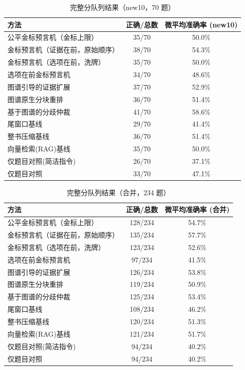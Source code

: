 \documentclass[UTF8,11pt]{ctexart}
\begin{document}
\begin{table}[t]
\centering
\caption{完整分队列结果（new10，70 题）}
\label{tab:full-new10}
\small
\begin{tabular}{lcc}
\toprule
方法 & 正确/总数 & 微平均准确率 (new10) \\
\midrule
公平金标预言机（金标上限） & 35/70 & 50.0\% \\
金标预言机（证据在前，原始顺序） & 38/70 & 54.3\% \\
金标预言机（选项在前，洗牌） & 35/70 & 50.0\% \\
选项在前金标预言机 & 34/70 & 48.6\% \\
图谱引导的证据扩展 & 37/70 & 52.9\% \\
图谱原生分块重排 & 36/70 & 51.4\% \\
基于图谱的分歧仲裁 & 41/70 & 58.6\% \\
尾窗口基线 & 29/70 & 41.4\% \\
整书压缩基线 & 36/70 & 51.4\% \\
向量检索(RAG)基线 & 35/70 & 50.0\% \\
仅题目对照(简洁指令) & 26/70 & 37.1\% \\
仅题目对照 & 33/70 & 47.1\% \\
\bottomrule
\end{tabular}
\end{table}

\begin{table}[t]
\centering
\caption{完整分队列结果（合并，234 题）}
\label{tab:full-pooled}
\small
\begin{tabular}{lcc}
\toprule
方法 & 正确/总数 & 微平均准确率 (合并) \\
\midrule
公平金标预言机（金标上限） & 128/234 & 54.7\% \\
金标预言机（证据在前，原始顺序） & 135/234 & 57.7\% \\
金标预言机（选项在前，洗牌） & 123/234 & 52.6\% \\
选项在前金标预言机 & 97/234 & 41.5\% \\
图谱引导的证据扩展 & 126/234 & 53.8\% \\
图谱原生分块重排 & 119/234 & 50.9\% \\
基于图谱的分歧仲裁 & 125/234 & 53.4\% \\
尾窗口基线 & 108/234 & 46.2\% \\
整书压缩基线 & 120/234 & 51.3\% \\
向量检索(RAG)基线 & 121/234 & 51.7\% \\
仅题目对照(简洁指令) & 94/234 & 40.2\% \\
仅题目对照 & 94/234 & 40.2\% \\
\bottomrule
\end{tabular}
\end{table}
\end{document}
